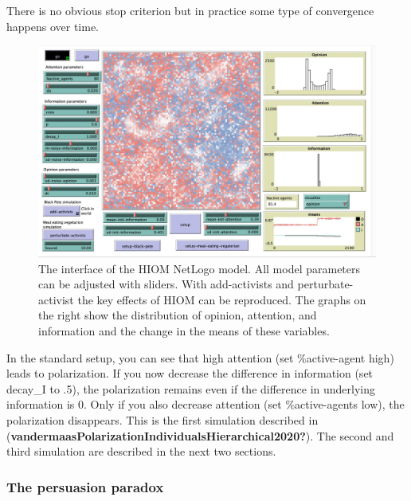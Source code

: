 \documentclass[
  a4paper,
  DIV=11,
  numbers=noendperiod,
  oneside]{scrreprt}
\begin{document}
There is no obvious stop criterion but in practice some type of
convergence happens over time.

\begin{figure}

{\centering \includegraphics{media/ch7/image10.jpg}

}

\caption{\label{fig-ch7-img10-old-98}The interface of the HIOM NetLogo
model. All model parameters can be adjusted with sliders. With
add-activists and perturbate-activist the key effects of HIOM can be
reproduced. The graphs on the right show the distribution of opinion,
attention, and information and the change in the means of these
variables.}

\end{figure}

In the standard setup, you can see that high attention (set
\%active-agent high) leads to polarization. If you now decrease the
difference in information (set decay\_I to .5), the polarization remains
even if the difference in underlying information is 0. Only if you also
decrease attention (set \%active-agents low), the polarization
disappears. This is the first simulation described in
(\textbf{vandermaasPolarizationIndividualsHierarchical2020?}). The
second and third simulation are described in the next two sections.

\hypertarget{sec-The-persuasion-paradox}{%
\subsubsection{The persuasion
paradox}\label{sec-The-persuasion-paradox}}
\end{document}
